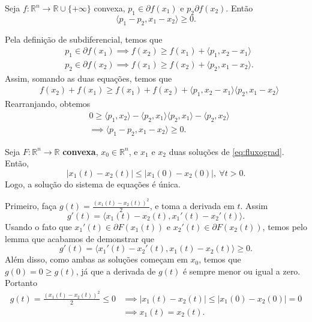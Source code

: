 \begin{lemma}
    Seja $f:\mathbb R^n \to \mathbb R \cup \{+\infty\}$ convexa, $p_1 \in \partial f(x_1)$
    e $p_2 \partial f(x_2)$. Então
    \begin{equation}
        \langle p_1 - p_2, x_1 - x_2 \rangle \geq 0.
    \end{equation}
\end{lemma}
\begin{prf}
    Pela definição de subdiferencial, temos que
    \begin{align*}
        &p_1 \in \partial f(x_1) \implies f(x_2) \geq f(x_1) + \langle p_1, x_2 - x_1\rangle\\
        &p_2 \in \partial f(x_2) \implies
        f(x_1) \geq f(x_2) + \langle p_2, x_1 - x_2\rangle.
    \end{align*}
    Assim, somando as duas equações, temos que
    \begin{align*}
        &f(x_2) + f(x_1) \geq f(x_1) + f(x_2) +
        \langle p_1, x_2 - x_1\rangle
        \langle p_2, x_1 - x_2\rangle
    \end{align*}
    Rearranjando, obtemos
    \begin{align*}
        &0 \geq
        \langle p_1,x_2 \rangle
        -\langle p_2,x_1 \rangle
        \langle p_2,x_1 \rangle
        -\langle p_2,x_2 \rangle \\
        &\implies
        \langle p_1 - p_2 , x_1 - x_2 \rangle \geq 0.
    \end{align*}
\end{prf}

\begin{theorem}
    Seja $F:\mathbb R^n \to \mathbb R$ \textbf{convexa}, $x_0 \in \mathbb R^n$, e
    $x_1$ e $x_2$ duas soluções de \eqref{eq:fluxograd}.
    Então,
    \begin{equation}
        |x_1(t) - x_2(t)| \leq |x_1(0) - x_2(0)|, \ \forall t >0.
    \end{equation}
    Logo, a solução do sistema de equações é única.
\end{theorem}
\begin{prf}
    Primeiro, faça $g(t) = \frac{(x_1(t) - x_2(t))^2}{2}$, e toma a derivada em $t$. Assim
    \begin{equation*}
        g'(t) = \langle x_1(t) - x_2(t), x_1'(t) - x_2'(t) \rangle.
    \end{equation*}
    Usando o fato que
    $x_1'(t) \in \partial F(x_1(t))$ e
    $x_2'(t) \in \partial F(x_2(t))$, temos pelo lemma que acabamos de demonstrar que
    \begin{equation*}
        g'(t) = \langle x_1'(t) - x_2'(t) , x_1(t) - x_2(t) \rangle \geq 0.
    \end{equation*}
    Além disso, como ambas as soluções começam em $x_0$, temos que $g(0) = 0 \geq g(t)$, já que
    a derivada de $g(t)$ é sempre menor ou igual a zero. Portanto
    \begin{align*}
        g(t) = \frac{(x_1(t) - x_2(t))^2}{2} \leq 0 &\implies
        |x_1(t) - x_2(t)| \leq |x_1(0) - x_2(0)| = 0 
        \\
        &\implies
        x_1(t) = x_2(t).
    \end{align*}
\end{prf}

